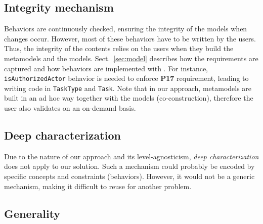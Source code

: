 

  \subsection{Integrity mechanism}


  Behaviors are continuously checked, ensuring the integrity of the models when
  changes occur. However, most of these behaviors have to be written by the
  users. Thus, the integrity of the contents relies on the users when they
  build the metamodels and the models. Sect.~\ref{sec:model} describes
  how the requirements are captured and how behaviors are implemented with
  \FML. For instance, \texttt{isAuthorizedActor} behavior is needed to enforce
  \textbf{P17} requirement, leading to writing \FML code in \texttt{TaskType}
  and \texttt{Task}. Note that in our approach, metamodels are built in an
 ad hoc way together with the models (co-construction), therefore the user
  also validates on an on-demand basis.

  \subsection{Deep characterization}



  Due to the nature of our approach and its level-agnosticism, \emph{deep
  characterization} does not apply to our solution. Such a mechanism could
  probably be encoded by specific concepts and constraints (behaviors).
  However, it would not be a generic mechanism, making it difficult to reuse
  for another problem.

  \subsection{Generality}


